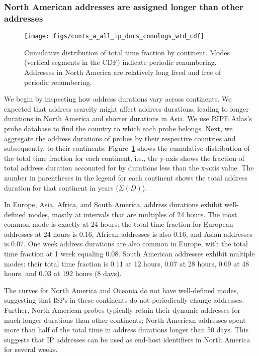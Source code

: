 \subsubsection*{North American addresses are assigned longer than other addresses}

\begin{figure}[tb]
  \begin{center}
    \texttt{[image: figs/conts\_a\_all\_ip\_durs\_connlogs\_wtd\_cdf]}
  \end{center}
  \caption{\label{fig:conts_all_durs} 
    Cumulative distribution of total time fraction by continent. 
    Modes (vertical segments
    in the CDF) indicate periodic renumbering.  Addresses in North America
    are relatively long lived and free of periodic renumbering.}
\end{figure}

We begin by inspecting how address durations vary across
continents.  We expected that address scarcity might affect
address durations, leading to longer durations in North
America and shorter durations in Asia.
We use RIPE
Atlas's probe database 
to find the country to which each probe belongs. Next, we aggregate the
address durations of probes by their respective countries and
subsequently, to their continents.
Figure~\ref{fig:conts_all_durs} shows the cumulative distribution of
the total time fraction for each
continent, i.e., the y-axis shows the fraction of total address duration accounted for by durations less than the x-axis value. 
The number in
parentheses in the legend for each continent shows the total
 address duration for that continent in years ($\Sigma(D)$).

In Europe, Asia, Africa, and South America, address durations exhibit well-defined modes,
mostly at intervals that are multiples of 24 hours. The most common mode is
exactly at 24 hours: the total time fraction for European addresses at
24 hours is 0.16, African addresses is also 0.16, and Asian addresses is 0.07.
One week address durations are also common in Europe, with the total
time fraction at 1 week equaling 0.08.
South American addresses exhibit multiple modes: their total time
fraction is 0.11 at
12 hours, 0.07 at 28 hours, 0.09 at 48 hours, and 0.03 at 192 hours (8
days). 

The curves for North America and Oceania do not have well-defined modes,
suggesting that ISPs in these continents do not periodically change
addresses. Further, North American probes typically retain their dynamic
addresses for much longer durations than other continents; North
American addresses spent more
than half of the total time in address durations longer than 50
days. This suggests that IP addresses can be used as end-host
identifiers in North America for several weeks.

